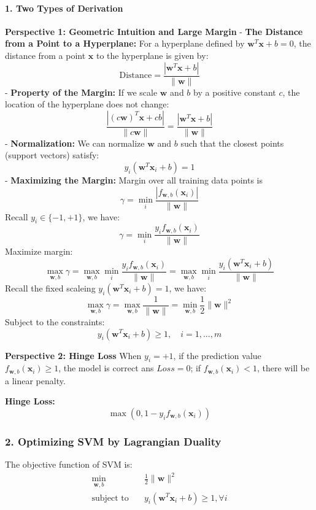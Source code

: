 \documentclass[
]{ctexart}
\begin{document}
\paragraph{1. Two Types of Derivation}\label{two-types-of-derivation}

\textbf{Perspective 1: Geometric Intuition and Large Margin} -
\textbf{The Distance from a Point to a Hyperplane:} For a hyperplane
defined by \(\mathbf{w}^T \mathbf{x} + b = 0\), the distance from a
point \(\mathbf{x}\) to the hyperplane is given by:
\[\text{Distance} = \frac{|\mathbf{w}^T \mathbf{x} + b|}{\|\mathbf{w}\|}\]
- \textbf{Property of the Margin:} If we scale \(\mathbf{w}\) and \(b\)
by a positive constant \(c\), the location of the hyperplane does not
change:
\[\frac{|(c\mathbf{w})^T \mathbf{x} + cb|}{\|c\mathbf{w}\|} = \frac{|\mathbf{w}^T \mathbf{x} + b|}{\|\mathbf{w}\|}\]
- \textbf{Normalization:} We can normalize \(\mathbf{w}\) and \(b\) such
that the closest points (support vectors) satisfy:
\[y_i (\mathbf{w}^T \mathbf{x}_i + b) = 1\] - \textbf{Maximizing the
Margin:} Margin over all training data points is
\[\gamma = \min_{i} \frac{|f_{\mathbf{w},b}(\mathbf{x}_i)|}{\|\mathbf{w}\|}\]
Recall \(y_i \in \{-1, +1\}\), we have:
\[\gamma = \min_{i} \frac{y_i f_{\mathbf{w},b}(\mathbf{x}_i)}{\|\mathbf{w}\|}\]
Maximize margin:
\[\max_{\mathbf{w}, b} \gamma = \max_{\mathbf{w}, b} \min_{i} \frac{y_i f_{\mathbf{w},b}(\mathbf{x}_i)}{\|\mathbf{w}\|} = \max_{\mathbf{w}, b} \min_{i} \frac{y_i (\mathbf{w}^T \mathbf{x}_i + b)}{\|\mathbf{w}\|}\]
Recall the fixed scaleing \(y_i (\mathbf{w}^T \mathbf{x}_i + b) = 1\),
we have:
\[\max_{\mathbf{w}, b} \gamma = \max_{\mathbf{w}, b} \frac{1}{\|\mathbf{w}\|} = \min_{\mathbf{w}, b} \frac{1}{2} \|\mathbf{w}\|^2\]
Subject to the constraints:
\[y_i (\mathbf{w}^T \mathbf{x}_i + b) \geq 1, \quad i = 1, ..., m\]

\textbf{Perspective 2: Hinge Loss} When \(y_i = + 1\), if the prediction
value \(f_{\mathbf{w},b}(\mathbf{x}_i) \geq 1\), the model is correct
ans \(Loss = 0\); if \(f_{\mathbf{w},b}(\mathbf{x}_i) < 1\), there will
be a linear penalty.

\textbf{Hinge Loss:} \[\max(0, 1 - y_i f_{\mathbf{w},b}(\mathbf{x}_i))\]

\subsubsection{2. Optimizing SVM by Lagrangian
Duality}\label{optimizing-svm-by-lagrangian-duality}

The objective function of SVM is:
\[\begin{aligned}\min_{\mathbf{w}, b} \quad & \frac{1}{2} \|\mathbf{w}\|^2 \\
\text{subject to} \quad & y_i (\mathbf{w}^T \mathbf{x}_i + b) \geq 1, \forall i
\end{aligned}\]
\end{document}
